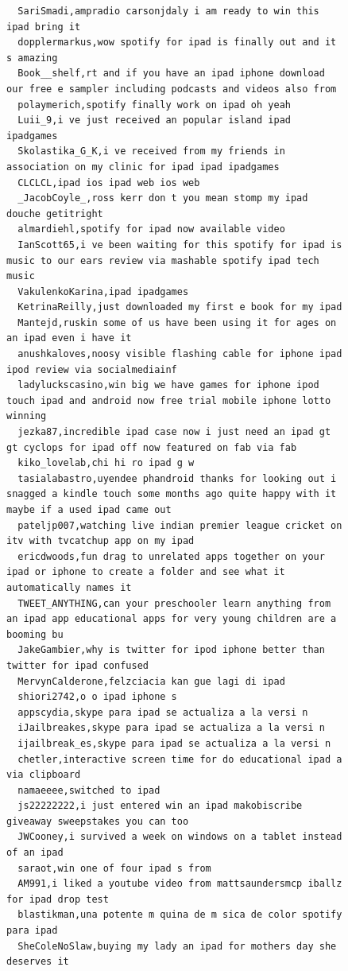 \begin{figure}[htpb]
\begin{verbatim}
  SariSmadi,ampradio carsonjdaly i am ready to win this ipad bring it
  dopplermarkus,wow spotify for ipad is finally out and it s amazing
  Book__shelf,rt and if you have an ipad iphone download our free e sampler including podcasts and videos also from
  polaymerich,spotify finally work on ipad oh yeah
  Luii_9,i ve just received an popular island ipad ipadgames
  Skolastika_G_K,i ve received from my friends in association on my clinic for ipad ipad ipadgames
  CLCLCL,ipad ios ipad web ios web
  _JacobCoyle_,ross kerr don t you mean stomp my ipad douche getitright
  almardiehl,spotify for ipad now available video
  IanScott65,i ve been waiting for this spotify for ipad is music to our ears review via mashable spotify ipad tech music
  VakulenkoKarina,ipad ipadgames
  KetrinaReilly,just downloaded my first e book for my ipad
  Mantejd,ruskin some of us have been using it for ages on an ipad even i have it
  anushkaloves,noosy visible flashing cable for iphone ipad ipod review via socialmediainf
  ladyluckscasino,win big we have games for iphone ipod touch ipad and android now free trial mobile iphone lotto winning
  jezka87,incredible ipad case now i just need an ipad gt gt cyclops for ipad off now featured on fab via fab
  kiko_lovelab,chi hi ro ipad g w
  tasialabastro,uyendee phandroid thanks for looking out i snagged a kindle touch some months ago quite happy with it maybe if a used ipad came out
  pateljp007,watching live indian premier league cricket on itv with tvcatchup app on my ipad
  ericdwoods,fun drag to unrelated apps together on your ipad or iphone to create a folder and see what it automatically names it
  TWEET_ANYTHING,can your preschooler learn anything from an ipad app educational apps for very young children are a booming bu
  JakeGambier,why is twitter for ipod iphone better than twitter for ipad confused
  MervynCalderone,felzciacia kan gue lagi di ipad
  shiori2742,o o ipad iphone s
  appscydia,skype para ipad se actualiza a la versi n
  iJailbreakes,skype para ipad se actualiza a la versi n
  ijailbreak_es,skype para ipad se actualiza a la versi n
  chetler,interactive screen time for do educational ipad a via clipboard
  namaeeee,switched to ipad
  js22222222,i just entered win an ipad makobiscribe giveaway sweepstakes you can too
  JWCooney,i survived a week on windows on a tablet instead of an ipad
  saraot,win one of four ipad s from
  AM991,i liked a youtube video from mattsaundersmcp iballz for ipad drop test
  blastikman,una potente m quina de m sica de color spotify para ipad
  SheColeNoSlaw,buying my lady an ipad for mothers day she deserves it

\end{verbatim}
\end{figure}
